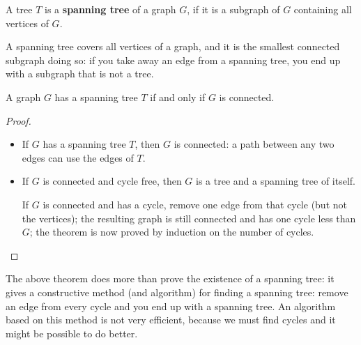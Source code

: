  \begin{definition}
A tree \textup{$T$ is a \textbf{spanning tree} of a graph $G$,
if it is a subgraph of $G$ containing all vertices of $G$.}
\end{definition}

A spanning tree covers all vertices of a graph, and it is the smallest
connected subgraph doing so: if you take away an edge from a spanning
tree, you end up with a subgraph that is not a tree.

 \begin{theorem}
A graph $G$ has a spanning tree $T$ if and only if $G$ is connected.
\end{theorem}
\begin{proof}
\begin{itemize}
\item
If $G$ has a spanning tree $T$, then $G$ is connected: a path between
any two edges can use the edges of $T$.

\item
If $G$ is connected and cycle free, then $G$ is a tree and a spanning
tree of itself.

If $G$ is connected and has a cycle, remove one edge from that cycle
(but not the vertices); the resulting graph is still connected and has
one cycle less than $G$; the theorem is now proved by induction on the
number of cycles.
\end{itemize}
\end{proof}

The above theorem does more than prove the existence of a spanning
tree: it gives a constructive method (and algorithm) for finding a
spanning tree: remove an edge from every cycle and you end up with a
spanning tree. An algorithm based on this method is not very
efficient, because we must find cycles and it might be possible to do
better.

